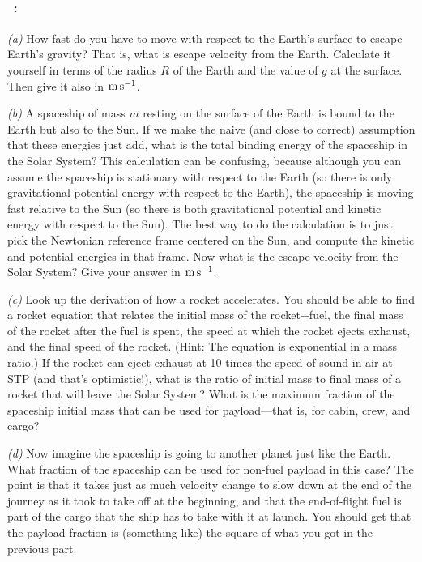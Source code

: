 \documentclass[12pt]{article}
\begin{document}
\paragraph{\problemname~\theproblem:}%
\textsl{(a)}
How fast do you have to move with respect to the Earth's surface to
escape Earth's gravity? That is, what is escape velocity from the Earth.
Calculate it yourself in terms of the radius $R$ of the Earth and the
value of $g$ at the surface. Then give it also in $\mathrm{m}\,\mathrm{s}^{-1}$.

\textsl{(b)} A spaceship of mass $m$ resting on the surface of the
Earth is bound to the Earth but also to the Sun. If we make
the naive (and close to correct) assumption that these energies just
add, what is the total binding energy of the spaceship in the Solar
System? This calculation can be confusing, because although you can assume
the spaceship is stationary with respect to the Earth (so there is
only gravitational potential energy with respect to the Earth), the
spaceship is moving fast relative to the Sun (so there is both
gravitational potential and kinetic energy with respect to the
Sun). The best way to do the calculation is to just pick the Newtonian reference
frame centered on the Sun, and compute the kinetic and potential
energies in that frame. Now what is the escape velocity from the Solar
System? Give your answer in $\mathrm{m}\,\mathrm{s}^{-1}$.

\textsl{(c)} Look up the derivation of how a rocket accelerates. You
should be able to find a rocket equation that relates the initial mass
of the rocket+fuel, the final mass of the rocket after the fuel is
spent, the speed at which the rocket ejects exhaust, and the final
speed of the rocket. (Hint: The equation is exponential in a mass
ratio.) If the rocket can eject exhaust at 10 times the speed of sound
in air at STP (and that's optimistic!), what is the ratio of initial
mass to final mass of a rocket that will leave the Solar System? What
is the maximum fraction of the spaceship initial mass that can be used
for payload---that is, for cabin, crew, and cargo?

\textsl{(d)} Now imagine the spaceship is going to another planet just
like the Earth. What fraction of the spaceship can be used for
non-fuel payload in this case? The point is that it takes just as much
velocity change to slow down at the end of the journey as it took to
take off at the beginning, and that the end-of-flight fuel is part of
the cargo that the ship has to take with it at launch. You should get
that the payload fraction is (something like) the square of what you got in
the previous part.
\end{document}
